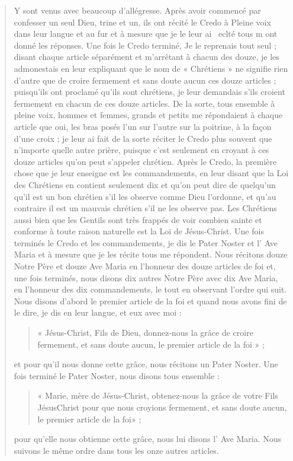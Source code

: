 \begin{quote}
Y sont venus avec beaucoup d'allégresse. Après avoir commencé
par confesser un seul Dieu, trine et un, ils ont récité le Credo à
Pleine voix dans leur langue et au fur et à mesure que je le leur ai
~eclté tous m ont donné les réponses. Une fois le Credo terminé,
Je le reprenais tout seul ; disant chaque article séparément et
m'arrêtant à chacun des douze, je les admonestais en leur expliquant que le nom de « Chrétiens » ne signifie rien d'autre que de
croire fermement et sans doute aucun ces douze articles ; puisqu'ils
ont proclamé qu'ils sont chrétiens, je leur demandais s'ils croient
fermement en chacun de ces douze articles. De la sorte, tous ensemble  à pleine voix, hommes et femmes, grands et petits me répondaient
à chaque article que oui, les bras posés l'un sur l'autre sur
la poitrine, à la façon d'une croix ; je leur ai fait de la sorte réciter
le Credo plus souvent que n'importe quelle autre prière, puisque
c'est seulement en croyant à ces douze articles qu'on peut
s'appeler chrétien. Après le Credo, la première chose que je leur
enseigne est les commandements, en leur disant que la Loi des
Chrétiens en contient seulement dix et qu'on peut dire de quelqu'un
qu'il est un bon chrétien s'il les observe comme Dieu l'ordonne,
et qu'au contraire il est un mauvais chrétien s'il ne les observe pas.
Les Chrétiens aussi bien que les Gentils sont très frappés de voir
combien sainte et conforme à toute raison naturelle est la Loi de
Jésus-Christ. Une fois terminés le Credo et les commandements,
je dis le Pater Noster et l' Ave Maria et à mesure que je les récite
tous me répondent. Nous récitons douze Notre Père et douze Ave
Maria en l'honneur des douze articles de foi et, une fois terminés,
nous disons dix autres Notre Père avec dix Ave Maria, en l'honneur
des dix commandements, le tout en observant l'ordre qui suit.
Nous disons d'abord le premier article de la foi et quand nous
avons fini de le dire, je dis en leur langue, et eux avec moi :
\begin{quote}
    « Jésus-Christ, Fils de Dieu, donnez-nous la grâce de croire fermement,
et sans doute aucun, le premier article de la foi » ;
\end{quote}
 et pour
qu'il nous donne cette grâce, nous récitons un Pater Noster. Une
fois terminé le Pater Noster, nous disons tous ensemble : \begin{quote}
    « Marie,
mère de Jésus-Christ, obtenez-nous la grâce de votre Fils JésusChrist
pour que nous croyions fermement, et sans doute aucun, le
premier article de la foi» ;
\end{quote} pour qu'elle nous obtienne cette grâce,
nous lui disons l' Ave Maria. Nous suivons le même ordre dans tous
les onze autres articles.


\end{quote}
